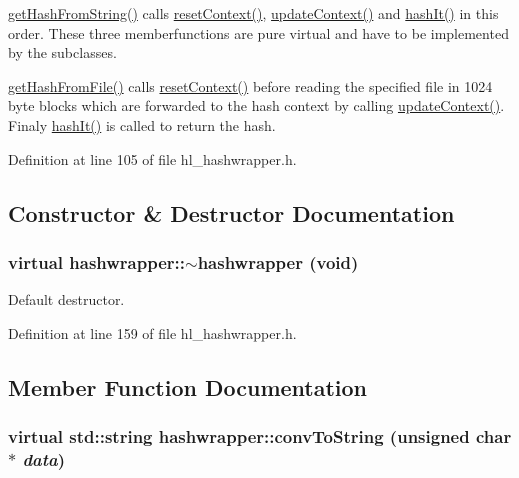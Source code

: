 \hyperlink{classhashwrapper_aa10904f0dc06eb54771ab26864622d0f}{getHashFromString()} calls \hyperlink{classhashwrapper_aa7d46e9630a794ff08cfb5307660a86d}{resetContext()}, \hyperlink{classhashwrapper_a7fe42ccf310e7d2cfe95f61732b73197}{updateContext()} and \hyperlink{classhashwrapper_a53f97c06885ed2b1fa255759a957a782}{hashIt()} in this order. These three memberfunctions are pure virtual and have to be implemented by the subclasses.

\hyperlink{classhashwrapper_ae4767e76e6d9e2b24b41f01ab9e7f03c}{getHashFromFile()} calls \hyperlink{classhashwrapper_aa7d46e9630a794ff08cfb5307660a86d}{resetContext()} before reading the specified file in 1024 byte blocks which are forwarded to the hash context by calling \hyperlink{classhashwrapper_a7fe42ccf310e7d2cfe95f61732b73197}{updateContext()}. Finaly \hyperlink{classhashwrapper_a53f97c06885ed2b1fa255759a957a782}{hashIt()} is called to return the hash. 

Definition at line 105 of file hl\_\-hashwrapper.h.

\subsection{Constructor \& Destructor Documentation}
\hypertarget{classhashwrapper_a0868440d13aa86a1bccca35e99a81381}{
\subsubsection[{$\sim$hashwrapper}]{\setlength{\rightskip}{0pt plus 5cm}virtual hashwrapper::$\sim$hashwrapper (void)}}
\label{classhashwrapper_a0868440d13aa86a1bccca35e99a81381}


Default destructor. 

Definition at line 159 of file hl\_\-hashwrapper.h.

\subsection{Member Function Documentation}
\hypertarget{classhashwrapper_a1dacf43b1b726cd19a09d11eba6cd082}{
\subsubsection[{convToString}]{\setlength{\rightskip}{0pt plus 5cm}virtual std::string hashwrapper::convToString (unsigned char $\ast$ {\em data})}}
\label{classhashwrapper_a1dacf43b1b726cd19a09d11eba6cd082}


